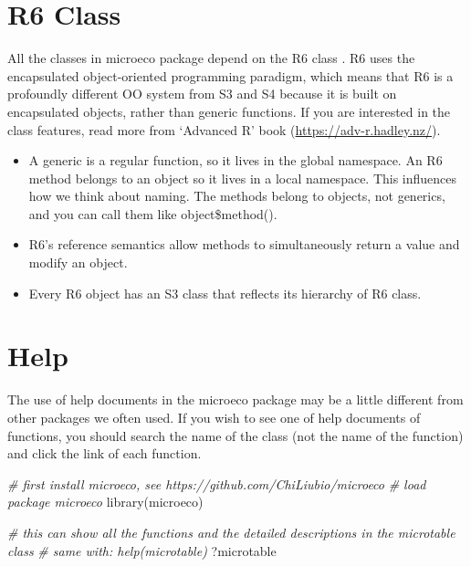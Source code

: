 \documentclass[
]{book}
\newenvironment{Shaded}{\begin{snugshade}}{\end{snugshade}}
\newcommand{\CommentTok}[1]{\textcolor[rgb]{0.56,0.35,0.01}{\textit{#1}}}
\newcommand{\FunctionTok}[1]{\textcolor[rgb]{0.00,0.00,0.00}{#1}}
\newcommand{\NormalTok}[1]{#1}
\begin{document}
\hypertarget{r6-class}{%
\section{R6 Class}\label{r6-class}}

All the classes in microeco package depend on the R6 class \citep{R6_Winston}.
R6 uses the encapsulated object-oriented programming paradigm,
which means that R6 is a profoundly different OO system from S3 and S4 because it is built on encapsulated objects, rather than generic functions.
If you are interested in the class features, read more from `Advanced R' book (\url{https://adv-r.hadley.nz/}).

\begin{itemize}
\item
  A generic is a regular function, so it lives in the global namespace. An R6 method belongs to an object so it lives in a local namespace.
  This influences how we think about naming. The methods belong to objects, not generics, and you can call them like object\$method().
\item
  R6's reference semantics allow methods to simultaneously return a value and modify an object.
\item
  Every R6 object has an S3 class that reflects its hierarchy of R6 class.
\end{itemize}

\hypertarget{help}{%
\section{Help}\label{help}}

The use of help documents in the microeco package may be a little different from other packages we often used.
If you wish to see one of help documents of functions, you should search the name of the class (not the name of the function)
and click the link of each function.

\begin{Shaded}
\begin{Highlighting}[]
\CommentTok{\# first install microeco, see https://github.com/ChiLiubio/microeco}
\CommentTok{\# load package microeco}
\FunctionTok{library}\NormalTok{(microeco)}
\end{Highlighting}
\end{Shaded}

\begin{Shaded}
\begin{Highlighting}[]
\CommentTok{\# this can show all the functions and the detailed descriptions in the microtable class}
\CommentTok{\# same with: help(microtable)}
\NormalTok{?microtable}
\end{Highlighting}
\end{Shaded}
\end{document}

